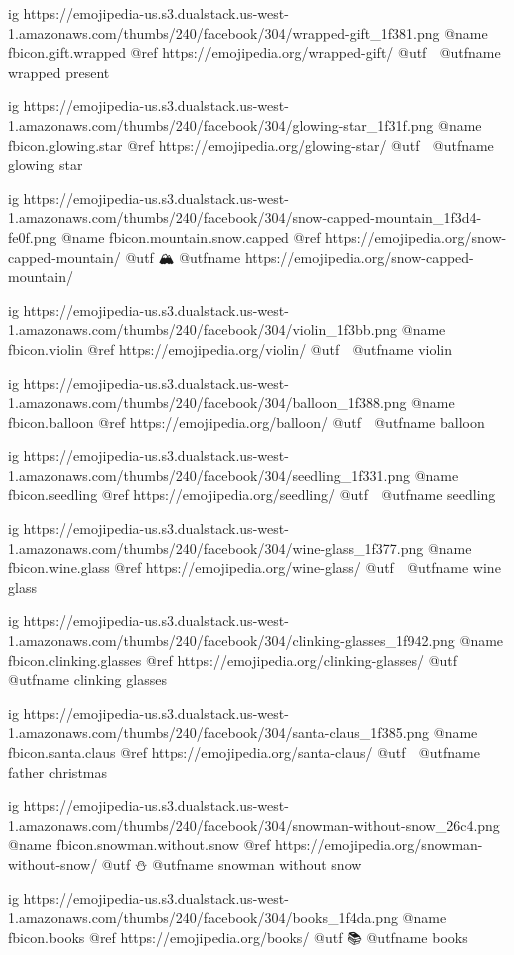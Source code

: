 	ig https://emojipedia-us.s3.dualstack.us-west-1.amazonaws.com/thumbs/240/facebook/304/wrapped-gift_1f381.png
	@name fbicon.gift.wrapped
	@ref https://emojipedia.org/wrapped-gift/
	@utf 🎁
	@utfname wrapped present

	ig https://emojipedia-us.s3.dualstack.us-west-1.amazonaws.com/thumbs/240/facebook/304/glowing-star_1f31f.png
	@name fbicon.glowing.star
	@ref https://emojipedia.org/glowing-star/
	@utf 🌟
	@utfname glowing star

	ig https://emojipedia-us.s3.dualstack.us-west-1.amazonaws.com/thumbs/240/facebook/304/snow-capped-mountain_1f3d4-fe0f.png
	@name fbicon.mountain.snow.capped
	@ref https://emojipedia.org/snow-capped-mountain/
	@utf 🏔
	@utfname https://emojipedia.org/snow-capped-mountain/

	ig https://emojipedia-us.s3.dualstack.us-west-1.amazonaws.com/thumbs/240/facebook/304/violin_1f3bb.png
	@name fbicon.violin
	@ref https://emojipedia.org/violin/
	@utf 🎻
	@utfname violin

	ig https://emojipedia-us.s3.dualstack.us-west-1.amazonaws.com/thumbs/240/facebook/304/balloon_1f388.png
	@name fbicon.balloon
	@ref https://emojipedia.org/balloon/
	@utf 🎈
	@utfname balloon

	ig https://emojipedia-us.s3.dualstack.us-west-1.amazonaws.com/thumbs/240/facebook/304/seedling_1f331.png
	@name fbicon.seedling
	@ref https://emojipedia.org/seedling/
	@utf 🌱
	@utfname seedling

	ig https://emojipedia-us.s3.dualstack.us-west-1.amazonaws.com/thumbs/240/facebook/304/wine-glass_1f377.png
	@name fbicon.wine.glass
	@ref https://emojipedia.org/wine-glass/
	@utf 🍷
	@utfname wine glass

	ig https://emojipedia-us.s3.dualstack.us-west-1.amazonaws.com/thumbs/240/facebook/304/clinking-glasses_1f942.png
	@name fbicon.clinking.glasses
	@ref https://emojipedia.org/clinking-glasses/
	@utf 🥂
	@utfname clinking glasses

	ig https://emojipedia-us.s3.dualstack.us-west-1.amazonaws.com/thumbs/240/facebook/304/santa-claus_1f385.png
	@name fbicon.santa.claus
	@ref https://emojipedia.org/santa-claus/
	@utf 🎅
	@utfname father christmas

	ig https://emojipedia-us.s3.dualstack.us-west-1.amazonaws.com/thumbs/240/facebook/304/snowman-without-snow_26c4.png
	@name fbicon.snowman.without.snow
	@ref https://emojipedia.org/snowman-without-snow/
	@utf ⛄
	@utfname snowman without snow

	ig https://emojipedia-us.s3.dualstack.us-west-1.amazonaws.com/thumbs/240/facebook/304/books_1f4da.png
	@name fbicon.books
	@ref https://emojipedia.org/books/
	@utf 📚
	@utfname books

\fi

